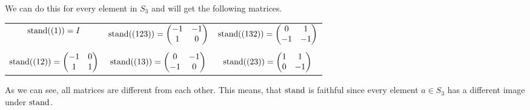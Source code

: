 We can do this for every element in $S_3$ and will get the following matrices.
\begin{table}[h]
    \centering
    \begin{tabular}{c c c}
        $\operatorname{stand}((1)) = I$ & $\operatorname{stand}((123)) = \begin{pmatrix}
            -1 & -1 \\
            1 & 0
        \end{pmatrix}$ & $\operatorname{stand}((132)) = \begin{pmatrix}
            0 & 1 \\
            -1 & -1
        \end{pmatrix}$ \\\\ $\operatorname{stand}((12)) = \begin{pmatrix}
            -1 & 0 \\
            1 & 1
        \end{pmatrix}$ & $\operatorname{stand}((13)) = \begin{pmatrix}
            0 & -1 \\
            -1 & 0
        \end{pmatrix}$ & $\operatorname{stand}((23)) = \begin{pmatrix}
            1 & 1 \\
            0 & -1
        \end{pmatrix}$
    \end{tabular}
\end{table}
As we can see, all matrices are different from each other.
This means, that $\operatorname{stand}$ is faithful since every element $a \in S_3$ has a different image under $\operatorname{stand}$.

